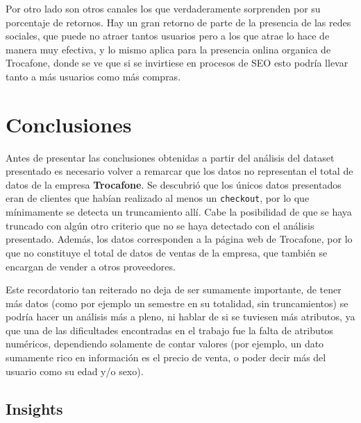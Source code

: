 \documentclass[a4paper]{article}
\begin{document}
Por otro lado son otros canales los que verdaderamente sorprenden por su porcentaje de retornos. Hay un gran retorno de parte de la presencia de las redes sociales, que puede no atraer tantos usuarios pero a los que atrae lo hace de manera muy efectiva, y lo mismo aplica para la presencia onlina organica de Trocafone, donde se ve que si se invirtiese en procesos de SEO esto podría llevar tanto a más usuarios como más compras.



\section{Conclusiones}

Antes de presentar las conclusiones obtenidas a partir del análisis del dataset presentado es necesario volver a remarcar que los datos no representan el total de datos de la empresa \textbf{Trocafone}. Se descubrió que los únicos datos presentados eran de clientes que habían realizado al menos un \texttt{checkout}, por lo que mínimamente se detecta un truncamiento allí. Cabe la posibilidad de que se haya truncado con algún otro criterio que no se haya detectado con el análisis presentado. Además, los datos corresponden a la página web de Trocafone, por lo que no constituye el total de datos de ventas de la empresa, que también se encargan de vender a otros proveedores.

Este recordatorio tan reiterado no deja de ser sumamente importante, de tener más datos (como por ejemplo un semestre en su totalidad, sin truncamientos) se podría hacer un análisis más a pleno, ni hablar de si se tuviesen más atributos, ya que una de las dificultades encontradas en el trabajo fue la falta de atributos numéricos, dependiendo solamente de contar valores (por ejemplo, un dato sumamente rico en información es el precio de venta, o poder decir más del usuario como su edad y/o sexo).

\subsection{Insights}
\end{document}
